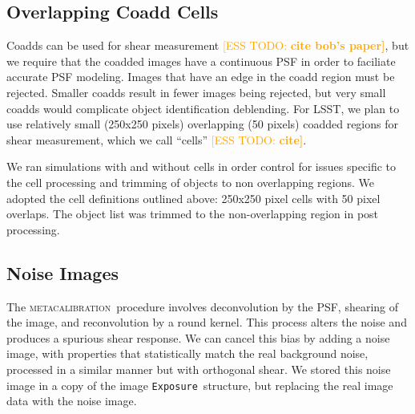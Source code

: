 \documentclass[iop, twocolappendix, appendixfloats, numberedappendix, apj]{hackemulateapj}
\newcommand{\esstodo}[1]{\textcolor{orange}{[ESS TODO: \bf #1]}}
\newcommand{\calexp}{\texttt{Exposure}}
\newcommand{\mcal}{\textsc{metacalibration}}
\begin{document}
\subsection{Overlapping Coadd Cells} \label{sec:sim:cells}

Coadds can be used for shear measurement \esstodo{cite bob's paper}, but we
require that the coadded images have a continuous PSF in order to faciliate
accurate PSF modeling.  Images that have an edge in the coadd region must be
rejected.  Smaller coadds result in fewer images being rejected, but very small
coadds would complicate object identification deblending.  For LSST, we plan to
use relatively small (250x250 pixels) overlapping (50 pixels) coadded regions
for shear measurement, which we call ``cells'' \esstodo{cite}.

We ran simulations with and without cells in order control for issues specific
to the cell processing and trimming of objects to non overlapping regions.  We
adopted the cell definitions outlined above: 250x250 pixel cells with 50 pixel
overlaps. The object list was trimmed to the non-overlapping region in post
processing.

\subsection{Noise Images} \label{sec:sim:noiseimages}

The \mcal\ procedure involves deconvolution by the PSF, shearing of the image,
and reconvolution by a round kernel.  This process alters the noise and
produces a spurious shear response.  We can cancel this bias by adding a noise
image, with properties that statistically match the real background noise,
processed in a similar manner but with orthogonal shear.  We stored this
noise image in a copy of the image \calexp\ structure, but replacing the
real image data with the noise image.
\end{document}
